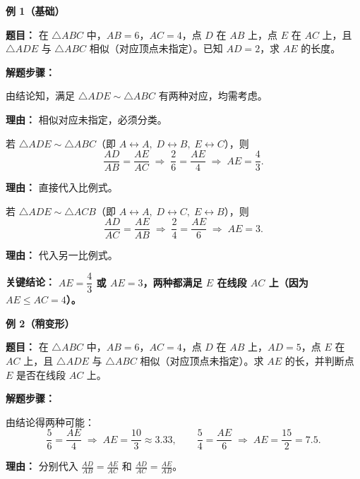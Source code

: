 \begin{examplebox}
	\textbf{\textcolor{CExample}{例 1（基础）}}

	\textbf{\textcolor{CExample}{题目：}}
	在 $\triangle ABC$ 中，$AB=6$，$AC=4$，点 $D$ 在 $AB$ 上，点 $E$ 在 $AC$ 上，且 $\triangle ADE$ 与 $\triangle ABC$ 相似（对应顶点未指定）。已知 $AD=2$，求 $AE$ 的长度。

	\textbf{\textcolor{CExample}{解题步骤：}}
	\begin{description}[style=nextline, leftmargin=2.8em, labelsep=0.5em, itemsep=0.45em]
		\item[\textbf{第一步（识别对应）：}]
			由结论知，满足 $\triangle ADE\sim\triangle ABC$ 有两种对应，均需考虑。
			\par\textbf{理由：}
			相似对应未指定，必须分类。

		\item[\textbf{第二步（第一种对应）：}]
			若 $\triangle ADE\sim\triangle ABC$（即 $A\leftrightarrow A,\;D\leftrightarrow B,\;E\leftrightarrow C$），则
			\[\frac{AD}{AB}=\frac{AE}{AC}
				\;\Longrightarrow\; \frac{2}{6}=\frac{AE}{4}
				\;\Longrightarrow\; AE=\frac{4}{3}.\]
				\par\textbf{理由：}
				直接代入比例式。

			\item[\textbf{第三步（第二种对应）：}]
				若 $\triangle ADE\sim\triangle ACB$（即 $A\leftrightarrow A,\;D\leftrightarrow C,\;E\leftrightarrow B$），则
				\[\frac{AD}{AC}=\frac{AE}{AB}
					\;\Longrightarrow\; \frac{2}{4}=\frac{AE}{6}
					\;\Longrightarrow\; AE=3.\]
					\par\textbf{理由：}
					代入另一比例式。
			\end{description}

			\textbf{\textcolor{CExample}{关键结论：}}
			\textbf{$AE=\dfrac{4}{3}$ 或 $AE=3$，两种都满足 $E$ 在线段 $AC$ 上（因为 $AE\leqslant AC=4$）。}

			\medskip
			\textbf{\textcolor{CExample}{例 2（稍变形）}}

			\textbf{\textcolor{CExample}{题目：}}
			在 $\triangle ABC$ 中，$AB=6$，$AC=4$，点 $D$ 在 $AB$ 上，$AD=5$，点 $E$ 在 $AC$ 上，且 $\triangle ADE$ 与 $\triangle ABC$ 相似（对应顶点未指定）。求 $AE$ 的长，并判断点 $E$ 是否在线段 $AC$ 上。

			\textbf{\textcolor{CExample}{解题步骤：}}
			\begin{description}[style=nextline, leftmargin=2.8em, labelsep=0.5em, itemsep=0.45em]
				\item[\textbf{第一步（分类计算比例）：}]
					由结论得两种可能：
					\[\frac{5}{6}=\frac{AE}{4}\;\Rightarrow\;AE=\frac{10}{3}\approx3.33,
						\qquad
						\frac{5}{4}=\frac{AE}{6}\;\Rightarrow\;AE=\frac{15}{2}=7.5.\]
						\par\textbf{理由：}
						分别代入 $\frac{AD}{AB}=\frac{AE}{AC}$ 和 $\frac{AD}{AC}=\frac{AE}{AB}$。


\end{description}
\end{examplebox}
